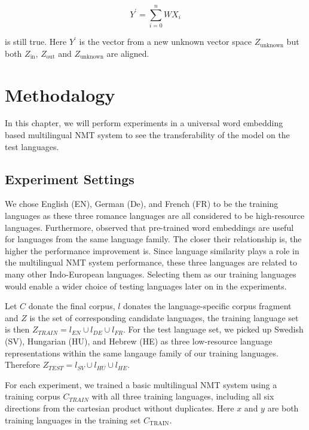 \documentclass[thesis,fonts=libertine]{cluu}
\begin{document}
\begin{equation*}
  Y^\prime = \sum_{i=0}^n WX_i
\end{equation*}

\noindent is still true. Here $Y^\prime$ is the vector from a new unknown vector space $Z_\text{unknown}$ but both $Z_\text{in}$, $Z_\text{out}$ and $Z_\text{unknown}$ are aligned.

\chapter{Methodalogy}
\label{chap:method}

In this chapter, we will perform experiments in a universal word embedding based multilingual NMT system to see the transferability of the model on the test languages.

\section{Experiment Settings}
\label{sec:initial_exp_settings}

We chose English (EN), German (De), and French (FR) to be the training languages as these three romance languages are all considered to be high-resource languages. Furthermore, \textcite{Qi:2018aa} observed that pre-trained word embeddings are useful for languages from the same language family. The closer their relationship is, the higher the performance improvement is. Since language similarity plays a role in the multilingual NMT system performance, these three languages are related to many other Indo-European languages. Selecting them as our training languages would enable a wider choice of testing languages later on in the experiments.

Let $C$ donate the final corpus, $l$ donates the language-specific corpus fragment and $Z$ is the set of corresponding candidate languages, the training language set is then $Z_{TRAIN} = {l_{EN}\cup l_{DE}\cup l_{FR}}$. For the test language set, we picked up Swedish (SV), Hungarian (HU), and Hebrew (HE) as three low-resource language representations within the same langauge family of our training languages. Therefore $Z_{TEST} = {l_{SV}\cup l_{HU}\cup l_{HE}}$.

For each experiment, we trained a basic multilingual NMT system using a training corpus $C_{TRAIN}$ with all three training languages, including all six directions from the cartesian product without duplicates. Here $x$ and $y$ are both training languages in the training set $C_{\text{TRAIN}}$.
\end{document}
